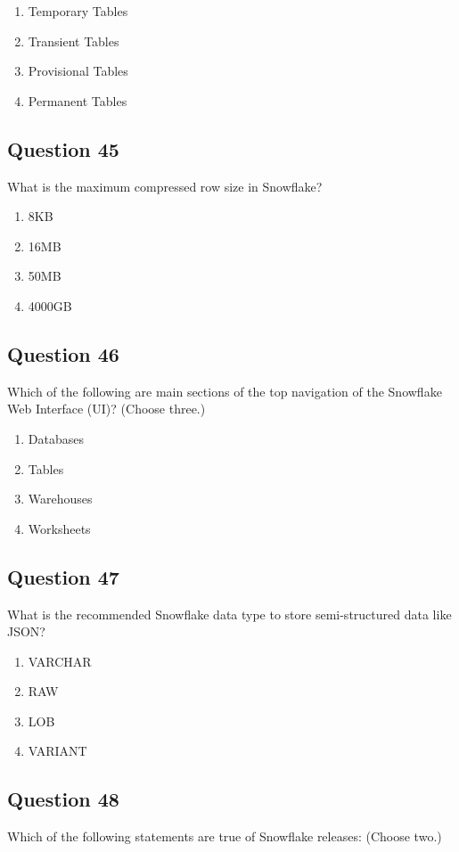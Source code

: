 \documentclass[12pt]{article}
\begin{document}
\begin{enumerate}[label=\Alph*.]
  \item Temporary Tables
  \item Transient Tables
  \item Provisional Tables
  \item Permanent Tables
\end{enumerate}

\subsection*{Question 45}
What is the maximum compressed row size in Snowflake?

\begin{enumerate}[label=\Alph*.]
  \item 8KB
  \item 16MB
  \item 50MB
  \item 4000GB
\end{enumerate}

\subsection*{Question 46}
Which of the following are main sections of the top navigation of the Snowflake Web Interface (UI)? (Choose three.)

\begin{enumerate}[label=\Alph*.]
  \item Databases
  \item Tables
  \item Warehouses
  \item Worksheets
\end{enumerate}

\subsection*{Question 47}
What is the recommended Snowflake data type to store semi-structured data like JSON?

\begin{enumerate}[label=\Alph*.]
  \item VARCHAR
  \item RAW
  \item LOB
  \item VARIANT
\end{enumerate}

\subsection*{Question 48}
Which of the following statements are true of Snowflake releases: (Choose two.)
\end{document}
